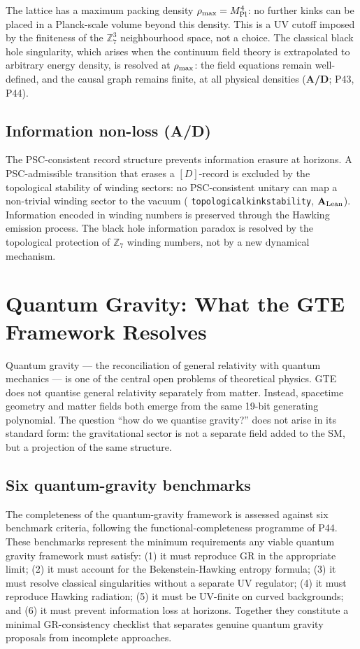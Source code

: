 \documentclass[11pt,openany]{book}
\theoremstyle{remark}
\newcommand{\GTE}{\text{GTE}}
\newcommand{\ZS}{\mathbb{Z}_7}
\newcommand{\lean}[1]{%
  \penalty-100
  \begingroup\def\_{\textunderscore\allowbreak}\texttt{#1}\endgroup}
\newcommand{\MPl}{M_{\rm Pl}}
\newcommand{\CMCA}{\text{CMCA}}
\newcommand{\CatAL}{\ensuremath{\textbf{A}_{\rm Lean}}}
\newcommand{\CatAD}{\textbf{A/D}}
\begin{document}
The \CMCA{} lattice has a maximum packing density $\rho_{\rm max} = \MPl^4$:
no further kinks can be placed in a Planck-scale volume beyond this density.
This is a UV cutoff imposed by the finiteness of the $\ZS^3$ neighbourhood space,
not a choice.
The classical black hole singularity, which arises when the continuum field theory is
extrapolated to arbitrary energy density, is resolved at $\rho_{\rm max}$:
the field equations remain well-defined, and the causal graph remains finite, at all
physical densities (\CatAD; P43, P44).

\subsection*{Information non-loss (\CatAD)}

The PSC-consistent record structure prevents information erasure at horizons.
A PSC-admissible transition that erases a $[D]$-record is excluded by the
topological stability of winding sectors: no PSC-consistent unitary can map a
non-trivial winding sector to the vacuum
(\lean{topological\_kink\_stability}, \CatAL).
Information encoded in winding numbers is preserved through the Hawking emission
process.
The black hole information paradox is resolved by the topological protection of
$\ZS$ winding numbers, not by a new dynamical mechanism.

\section{Quantum Gravity: What the GTE Framework Resolves}
\label{sec:quantum_gravity}

Quantum gravity --- the reconciliation of general relativity with quantum mechanics
--- is one of the central open problems of theoretical physics.
GTE does not quantise general relativity separately from matter.
Instead, spacetime geometry and matter fields both emerge from the same 19-bit
generating polynomial.
The question ``how do we quantise gravity?'' does not arise in its standard form:
the gravitational sector is not a separate field added to the SM, but a projection of
the same \CMCA{} structure.

\subsection*{Six quantum-gravity benchmarks}

The completeness of the \GTE{} quantum-gravity framework is assessed against six
benchmark criteria, following the functional-completeness programme of P44.
These benchmarks represent the minimum requirements any viable quantum gravity
framework must satisfy: (1) it must reproduce GR in the appropriate limit; (2) it
must account for the Bekenstein-Hawking entropy formula; (3) it must resolve classical
singularities without a separate UV regulator; (4) it must reproduce Hawking radiation;
(5) it must be UV-finite on curved backgrounds; and (6) it must prevent information
loss at horizons.  Together they constitute a minimal GR-consistency checklist that
separates genuine quantum gravity proposals from incomplete approaches.
\end{document}
